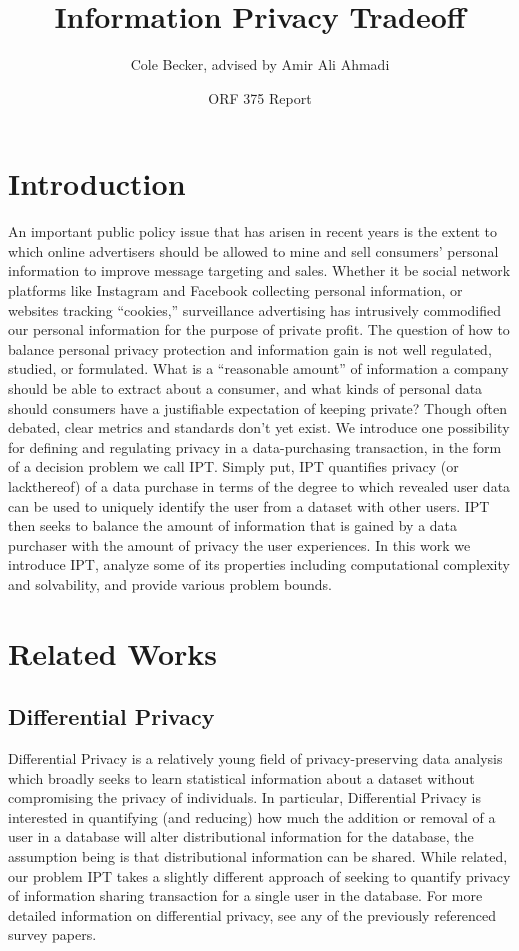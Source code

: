\documentclass[12pt]{article}
\begin{document}
\title{Information Privacy Tradeoff}
\author{Cole Becker, advised by Amir Ali Ahmadi}
\date{ORF 375 Report}
\maketitle
\section{Introduction}
An important public policy issue that has arisen in recent years is the extent to which online advertisers should be allowed to mine and sell consumers’ personal information to improve message targeting and sales. Whether it be social network platforms like Instagram and Facebook collecting personal information, or websites tracking “cookies,'' surveillance advertising has intrusively commodified our personal information for the purpose of private profit. The question of how to balance personal privacy protection and information gain is not well regulated, studied, or formulated. What is a “reasonable amount” of information a company should be able to extract about a consumer, and what kinds of personal data should consumers have a justifiable expectation of keeping private? Though often debated, clear metrics and standards don’t yet exist. We introduce one possibility for defining and regulating privacy in a data-purchasing transaction, in the form of a decision problem we call \gls{IPT}. Simply put, \gls{IPT} quantifies privacy (or lackthereof) of a data purchase in terms of the degree to which revealed user data can be used to uniquely identify the user from a dataset with other users. \gls{IPT} then seeks to balance the amount of information that is gained by a data purchaser with the amount of privacy the user experiences. In this work we introduce \gls{IPT}, analyze some of its properties including computational complexity and solvability, and provide various problem bounds.

\section{Related Works}
\subsection{Differential Privacy}
Differential Privacy \cite{dwork2008differential}\cite{hassan2019differential}\cite{zhao2022survey}\cite{ji2014differential} is a relatively young field of privacy-preserving data analysis which broadly seeks to learn statistical information about a dataset without compromising the privacy of individuals. In particular, Differential Privacy is interested in quantifying (and reducing) how much the addition or removal of a user in a database will alter distributional information for the database, the assumption being is that distributional information can be shared. While related, our problem \gls{IPT} takes a slightly different approach of seeking to quantify privacy of information sharing transaction for a single user in the database. For more detailed information on differential privacy, see any of the previously referenced survey papers.
\end{document}
